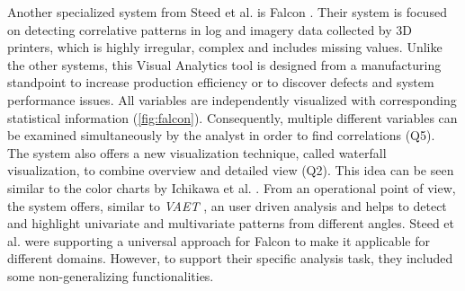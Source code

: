 \documentclass[electronic]{vgtc}             %
\begin{document}
Another specialized system from Steed et al. is Falcon \cite{steed:2017}.
Their system is focused on detecting correlative patterns in log and imagery data collected by 3D printers, which is highly irregular, complex and includes missing values.
Unlike the other systems, this Visual Analytics tool is designed from a manufacturing standpoint to increase production efficiency or to discover defects and system performance issues.
All variables are independently visualized with corresponding statistical information (\autoref{fig:falcon}). 
Consequently, multiple different variables can be examined simultaneously by the analyst in order to find correlations (Q5).
The system also offers a new visualization technique, called waterfall visualization, to combine overview and detailed view (Q2). 
This idea can be seen similar to the color charts by Ichikawa et al. \cite{ichikawa:2002}.
From an operational point of view, the system offers, similar to \textit{VAET}  \cite{Xie:2014}, an user driven analysis and helps to detect and highlight univariate and multivariate patterns from different angles.
Steed et al. were supporting a universal approach for Falcon to make it applicable for different domains. 
However, to support their specific analysis task, they included some non-generalizing functionalities. 
\end{document}
